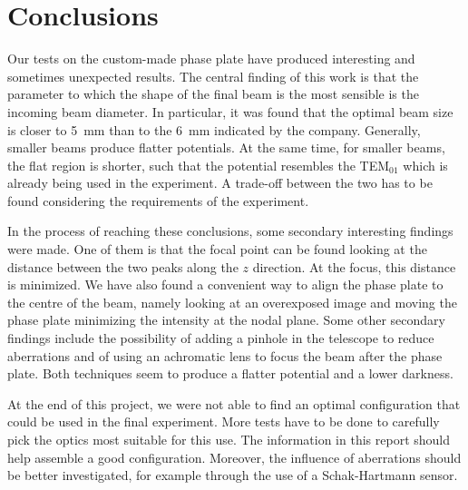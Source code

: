 \chapter{Conclusions}

Our tests on the custom-made phase plate have produced interesting and sometimes unexpected results. The central finding of this work is that the parameter to which the shape of the final beam is the most sensible is the incoming beam diameter. In particular, it was found that the optimal beam size is closer to \SI{5}{mm} than to the \SI{6}{mm} indicated by the company. Generally, smaller beams produce flatter potentials. At the same time, for smaller beams, the flat region is shorter, such that the potential resembles the TEM$_{01}$ which is already being used in the experiment. A trade-off between the two has to be found considering the requirements of the experiment.

In the process of reaching these conclusions, some secondary interesting findings were made. One of them is that the focal point can be found looking at the distance between the two peaks along the $z$ direction. At the focus, this distance is minimized. We have also found a convenient way to align the phase plate to the centre of the beam, namely looking at an overexposed image and moving the phase plate minimizing the intensity at the nodal plane. Some other secondary findings include the  possibility of adding a pinhole in the telescope to reduce aberrations and of using an achromatic lens to focus the beam after the phase plate. Both techniques seem to produce a flatter potential and a lower darkness.

At the end of this project, we were not able to find an optimal configuration that could be used in the final experiment. More tests have to be done to carefully pick the optics most suitable for this use. The information in this report should help assemble a good configuration. Moreover, the influence of aberrations should be better investigated, for example through the use of a Schak-Hartmann sensor.